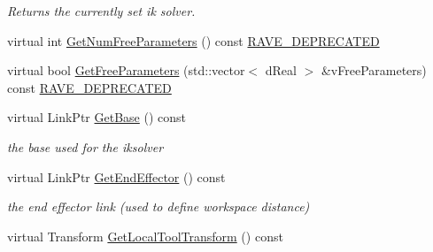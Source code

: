 \begin{DoxyCompactItemize}
\begin{DoxyCompactList}\small\item\em Returns the currently set ik solver. \item\end{DoxyCompactList}\item 
virtual int \hyperlink{classOpenRAVE_1_1RobotBase_1_1Manipulator_ab73a54e94fe2be07ec7dc08220585ae9}{GetNumFreeParameters} () const \hyperlink{classOpenRAVE_1_1RobotBase_ad7131b2e388f7f953e9cc14f7336c8e2}{RAVE\_\-DEPRECATED}
\item 
virtual bool \hyperlink{classOpenRAVE_1_1RobotBase_1_1Manipulator_ad1c511325beab0040d0b5f764291ec86}{GetFreeParameters} (std::vector$<$ dReal $>$ \&vFreeParameters) const \hyperlink{classOpenRAVE_1_1RobotBase_ad7131b2e388f7f953e9cc14f7336c8e2}{RAVE\_\-DEPRECATED}
\item 
\hypertarget{classOpenRAVE_1_1RobotBase_1_1Manipulator_ab77b38a94a16401b402f178513e9af5d}{
virtual LinkPtr \hyperlink{classOpenRAVE_1_1RobotBase_1_1Manipulator_ab77b38a94a16401b402f178513e9af5d}{GetBase} () const }
\label{classOpenRAVE_1_1RobotBase_1_1Manipulator_ab77b38a94a16401b402f178513e9af5d}

\begin{DoxyCompactList}\small\item\em the base used for the iksolver \item\end{DoxyCompactList}\item 
\hypertarget{classOpenRAVE_1_1RobotBase_1_1Manipulator_a359b65aa0b4feca9d86f6f300dd0a50a}{
virtual LinkPtr \hyperlink{classOpenRAVE_1_1RobotBase_1_1Manipulator_a359b65aa0b4feca9d86f6f300dd0a50a}{GetEndEffector} () const }
\label{classOpenRAVE_1_1RobotBase_1_1Manipulator_a359b65aa0b4feca9d86f6f300dd0a50a}

\begin{DoxyCompactList}\small\item\em the end effector link (used to define workspace distance) \item\end{DoxyCompactList}\item 
\hypertarget{classOpenRAVE_1_1RobotBase_1_1Manipulator_afc05cfe6a87b76f1027596591ee688ce}{
virtual Transform \hyperlink{classOpenRAVE_1_1RobotBase_1_1Manipulator_afc05cfe6a87b76f1027596591ee688ce}{GetLocalToolTransform} () const }
\label{classOpenRAVE_1_1RobotBase_1_1Manipulator_afc05cfe6a87b76f1027596591ee688ce}


\end{DoxyCompactItemize}

